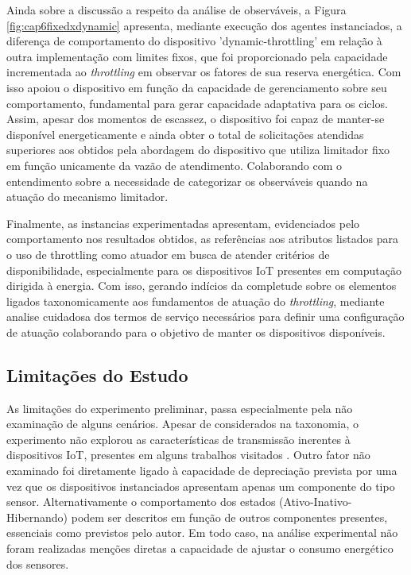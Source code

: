 Ainda sobre a discussão a respeito da análise de observáveis, a Figura \ref{fig:cap6fixedxdynamic} apresenta, mediante execução dos agentes instanciados, a diferença de comportamento do dispositivo 'dynamic-throttling' em relação à outra implementação com limites fixos, que foi proporcionado pela capacidade incrementada ao \textit{throttling} em observar os fatores de sua reserva energética. Com isso apoiou o dispositivo em função da capacidade de gerenciamento sobre seu comportamento, fundamental para gerar capacidade adaptativa para os ciclos. Assim, apesar dos momentos de escassez, o dispositivo foi capaz de manter-se disponível energeticamente e ainda obter o total de solicitações atendidas superiores aos obtidos pela abordagem do dispositivo que utiliza limitador fixo em função unicamente da vazão de atendimento. Colaborando com o entendimento sobre a necessidade de categorizar os observáveis quando na atuação do mecanismo limitador.
 
Finalmente, as instancias experimentadas apresentam, evidenciados pelo comportamento nos resultados obtidos, as referências aos atributos listados para o uso de throttling como atuador em busca de atender critérios de disponibilidade, especialmente para os dispositivos \acs{IoT} presentes em computação dirigida à energia. Com isso, gerando indícios da completude sobre os elementos ligados taxonomicamente aos fundamentos de atuação do \textit{throttling}, mediante analise cuidadosa dos termos de serviço necessários para definir uma configuração de atuação colaborando para o objetivo de manter os dispositivos disponíveis.



\subsection{Limitações do Estudo}

As limitações do experimento preliminar, passa especialmente pela não examinação de alguns cenários. Apesar de considerados na taxonomia, o experimento não explorou as características de transmissão inerentes à dispositivos \acs{IoT}, presentes em alguns trabalhos visitados \cite{gong_sleep_2022}. Outro fator não examinado foi diretamente ligado à capacidade de depreciação prevista por  uma vez que os dispositivos instanciados apresentam apenas um componente do tipo sensor. Alternativamente o comportamento dos estados (Ativo-Inativo-Hibernando) podem ser descritos em função de outros componentes presentes, essenciais como previstos pelo autor. Em todo caso, na análise experimental não foram realizadas menções diretas a capacidade de ajustar o consumo energético dos sensores.


